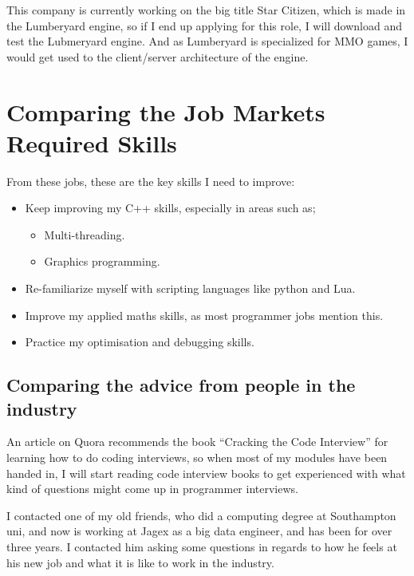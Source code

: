 \documentclass{scrartcl}
\begin{document}
This company is currently working on the big title Star Citizen, which is made in the Lumberyard engine, so if I end up applying for this role, I will download and test the Lubmeryard engine.
And as Lumberyard is specialized for MMO games, I would get used to the client/server architecture of the engine.







\section{Comparing the Job Markets Required Skills}
From these jobs, these are the key skills I need to improve:

\begin{itemize}
	\item Keep improving my C++ skills, especially in areas such as;
		\begin{itemize}
			\item Multi-threading.
			\item Graphics programming.
		\end{itemize}
	\item Re-familiarize myself with scripting languages like python and Lua.
	\item Improve my applied maths skills, as most programmer jobs mention this. 
	\item Practice my optimisation and debugging skills.
\end{itemize}



\subsection{Comparing the advice from people in the industry}
An article on Quora \cite{codeBookreview} recommends the book ``Cracking the Code Interview'' \cite{Chinmoy} for learning how to do coding interviews, so when most of my modules have been handed in, I will start reading code interview books to get experienced with what kind of questions might come up in programmer interviews.

I contacted one of my old friends, who did a computing degree at Southampton uni, and now is working at Jagex as a big data engineer, and has been for over three years. 
I contacted him asking some questions in regards to how he feels at his new job and what it is like to work in the industry.
\end{document}
